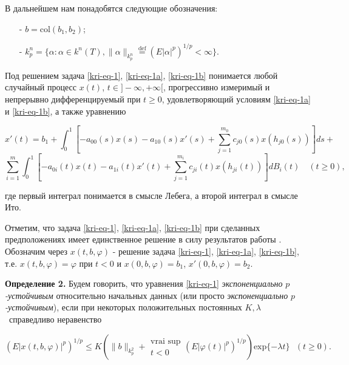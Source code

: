 В дальнейшем нам понадобятся следующие обозначения:

\begin{itemize}
	\item[-]
	$b=\text{col}(b_1,b_2)$;
	
	\item[-]
	$k_p^n=\{\alpha :\alpha \in k^n(T),\|\alpha \|_{k_p^n}\overset{\text{def}}{=}\left(E|\alpha
	|^p\right)^{1/p}<\infty \}$.
\end{itemize}

Под решением задача \eqref{kri-eq-1}, \eqref{kri-eq-1a}, \eqref{kri-eq-1b} понимается любой случайный процесс $x(t)$, $t\in ]-\infty ,+\infty[$, прогрессивно измеримый и непрерывно дифференцируемый при  $t\ge 0$, удовлетворяющий условиям \eqref{kri-eq-1a} и \eqref{kri-eq-1b}, а также уравнению

\begin{equation}\label{kri-eq-1-1}
	x'(t) = b_1+ \int_{0}^{1} \left[-a_{00}(s)x(s) - a_{10}(s)x'(s) + \sum_{j=1}^{m_0}c_{j0}(s)x(h_{j0}(s))\right]ds +
\end{equation}
\begin{equation*}
	\sum_{i=1}^{m} \int_{0}^{1} \left[-a_{0i}(t)x(t)-a_{1i}(t)x'(t)+\sum_{j=1}^{m_i}c_{ji}(t)x(h_{ji}(t))\right]dB_i(t) \quad (t \ge 0),
\end{equation*}

где первый интеграл понимается в смысле Лебега, а второй интеграл в смысле Ито.

Отметим, что задача \eqref{kri-eq-1}, \eqref{kri-eq-1a}, \eqref{kri-eq-1b} при сделанных предположениях имеет единственное решение в силу результатов работы \cite{kri-bib-10}. Обозначим через $x(t,b,\varphi )$ - решение задача \eqref{kri-eq-1}, \eqref{kri-eq-1a}, \eqref{kri-eq-1b}, т.е. $x(t,b,\varphi)=\varphi$ при $t<0$ и $x(0,b,\varphi)=b_1$, $x'(0,b,\varphi)=b_2$.

\textbf{Определение 2.} Будем говорить, что уравнения \eqref{kri-eq-1} \textit{экспоненциально } $p$\textit{{}-устойчивым}
относительно начальных данных (или просто \textit{экспоненциально } $p$\textit{{}-устойчивым}), если при некоторых
положительных постоянных  $K,\lambda $ \ справедливо неравенство

\begin{equation*}
(E|x(t,b,\varphi )|^p)^{1/p}\le K\left(\|b\|_{k_p^2}+\begin{matrix}\text{vrai sup}\\t<0\end{matrix}(E|\varphi
(t)|^p)^{1/p}\right)\text{exp}\{-\mathit{\lambda t}\}\text{  }(t\ge 0).
\end{equation*}

